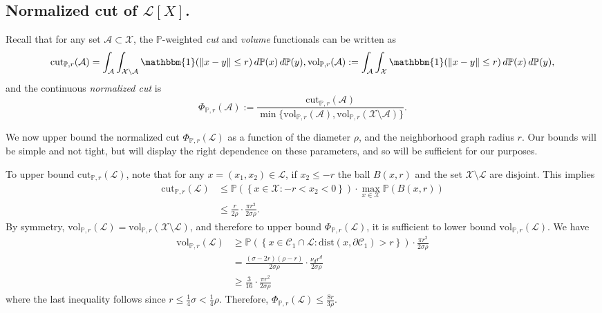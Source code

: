 \documentclass[11pt,twoside]{article}
\theoremstyle{definition}
\newcommand{\set}[1]{\left\{#1\right\}}
\newcommand{\vol}{\mathrm{vol}}
\newcommand{\cut}{\mathrm{cut}}
\newcommand{\norm}[1]{\left\lVert#1\right\rVert}
\newcommand{\1}{\mathbbm{1}}
\newcommand{\dist}{\mathrm{dist}}
\newcommand{\Xbf}{X}
\newcommand{\Pbb}{\mathbb{P}}
\newcommand{\Cset}{\mathcal{C}}
\newcommand{\Aset}{\mathcal{A}}
\begin{document}
\subsection{Normalized cut of $\mathcal{L}[\Xbf]$.}

Recall that for any set $\mathcal{A} \subset \mathcal{X}$, the $\Pbb$-weighted \emph{cut} and \emph{volume} functionals can be written as
\begin{equation*}
\cut_{\Pbb,r}(\Aset) = \int_{\Aset} \int_{\mathcal{X} \setminus \Aset} \1(\norm{x - y} \leq r) \,d\Pbb(x) \,d\Pbb(y), \vol_{\Pbb,r}(\Aset):= \int_{\Aset} \int_{\mathcal{X}} \1(\norm{x - y} \leq r) \,d\Pbb(x) \,d\Pbb(y),
\end{equation*}
and the continuous \emph{normalized cut} is
\begin{equation*}
\Phi_{\Pbb,r}(\Aset) := \frac{\cut_{\Pbb,r}(\Aset)}{\min\{\vol_{\Pbb,r}(\Aset),\vol_{\Pbb,r}(\mathcal{X} \setminus \Aset)\}}.
\end{equation*}

We now upper bound the normalized cut $\Phi_{\Pbb,r}(\mathcal{L})$ as a function of the diameter $\rho$, and the neighborhood graph radius $r$. Our bounds will be simple and not tight, but will display the right dependence on these parameters, and so will be sufficient for our purposes.

To upper bound $\cut_{\Pbb,r}(\mathcal{L})$, note that for any $x = (x_1,x_2) \in \mathcal{L}$, if $x_2 \leq -r$ the ball $B(x,r)$ and the set $\mathcal{X}\setminus\mathcal{L}$ are disjoint. This implies
\begin{align*}
\cut_{\Pbb,r}(\mathcal{L}) & \leq \Pbb(\set{x \in \mathcal{X}: -r < x_2 < 0}) \cdot \max_{x \in \mathcal{X}} \Pbb(B(x,r)) \\
& \leq \frac{r}{2 \rho} \cdot \frac{\pi r^2}{2 \sigma \rho}.
\end{align*}
By symmetry, $\vol_{\Pbb,r}(\mathcal{L}) = \vol_{\Pbb,r}(\mathcal{X} \setminus \mathcal{L})$, and therefore to upper bound $\Phi_{\Pbb,r}(\mathcal{L})$, it is sufficient to lower bound $\vol_{\Pbb,r}(\mathcal{L})$. We have
\begin{align*}
\vol_{\Pbb,r}(\mathcal{L}) & \geq \Pbb(\set{x \in \Cset_1 \cap \mathcal{L}: \dist(x, \partial \Cset_1) > r}) \cdot \frac{\pi r^2}{2 \sigma \rho} \\
& = \frac{(\sigma - 2r)(\rho - r)}{2 \sigma \rho} \cdot \frac{\nu_d r^d}{2 \sigma \rho}  \\
& \geq \frac{3}{16} \cdot \frac{\pi r^2}{2 \sigma \rho}
\end{align*}
where the last inequality follows since $r \leq \frac{1}{4}\sigma < \frac{1}{4}\rho$. Therefore, $\Phi_{\Pbb,r}(\mathcal{L}) \leq \frac{8r}{3\rho}.$
\end{document}
